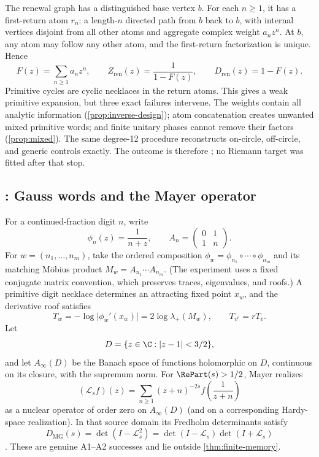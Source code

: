 The renewal graph has a distinguished base vertex \(b\).  For each \(n\ge1\),
it has a first-return atom \(r_n\): a length-\(n\) directed path from \(b\)
back to \(b\), with internal vertices disjoint from all other atoms and
aggregate complex weight \(a_nz^n\).  At \(b\), any atom may follow any other atom, and
the first-return factorization is unique.  Hence
\[
  F(z)=\sum_{n\ge1}a_nz^n,\qquad
  Z_{\mathrm{ren}}(z)=\frac{1}{1-F(z)},\qquad
  D_{\mathrm{ren}}(z)=1-F(z).
\]
Primitive cycles are cyclic necklaces in the return atoms.  This gives a weak
primitive expansion, but three exact failures intervene.  The
weights contain all analytic information
(\cref{prop:inverse-design}); atom concatenation creates unwanted mixed
primitive words; and finite unitary phases cannot remove their factors
(\cref{prop:mixed}).  The same degree-12 procedure reconstructs on-circle,
off-circle, and generic controls exactly.  The outcome is therefore
; no Riemann target was fitted after
that stop.

\subsection{: Gauss words and the Mayer operator}

For a continued-fraction digit \(n\), write
\[
  \phi_n(z)=\frac{1}{n+z},\qquad
  A_n=\begin{pmatrix}0&1\\1&n\end{pmatrix}.
\]
For \(w=(n_1,\ldots,n_m)\), take the ordered composition
\(\phi_w=\phi_{n_1}\circ\cdots\circ\phi_{n_m}\) and its matching Möbius
product \(M_w=A_{n_1}\cdots A_{n_m}\).  (The experiment uses a fixed
conjugate matrix convention, which preserves traces, eigenvalues, and roofs.)
A primitive digit necklace determines an attracting fixed point \(x_w\), and
the derivative roof satisfies
\[
  T_w=-\log\lvert\phi_w'(x_w)\rvert
      =2\log\lambda_+(M_w),\qquad T_{v^r}=rT_v.
\]
Let
\[
  D=\{z\in\C:\lvert z-1\rvert<3/2\},
\]
and let \(A_\infty(D)\) be the Banach space of functions holomorphic on
\(D\), continuous on its closure, with the supremum norm.  For
\(\RePart(s)>1/2\), Mayer realizes
\[
  (\mathcal L_s f)(z)=\sum_{n\ge1}(z+n)^{-2s}
  f\!\left(\frac1{z+n}\right)
\]
as a nuclear operator of order zero on \(A_\infty(D)\) (and on a
corresponding Hardy-space realization).  In that source domain its Fredholm
determinants satisfy
\[
  D_{\mathrm{MG}}(s)
  =\det(I-\mathcal L_s^2)
  =\det(I-\mathcal L_s)\det(I+\mathcal L_s)
\]
\citep{mayer1990gauss,mayer1991selberg}.  These are genuine A1--A2 successes
and lie outside \cref{thm:finite-memory}.


